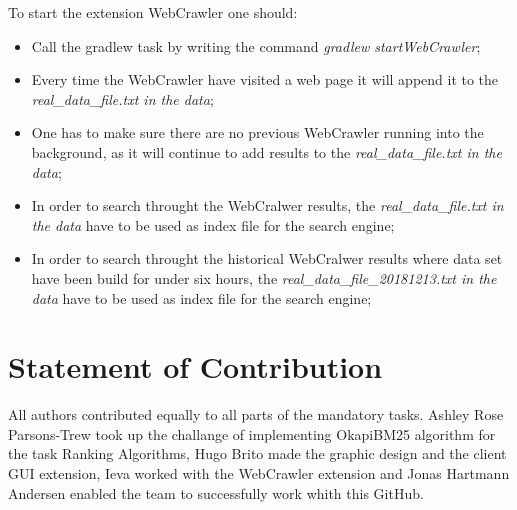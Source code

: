 To start the extension WebCrawler one should:
\begin{itemize}

\item Call the gradlew task by writing the command  \textit{gradlew startWebCrawler};
\item Every time the WebCrawler have visited a web page it will append it to the \textit{real\_data\_file.txt in the data};
\item One has to make sure there are no previous WebCrawler running into the background, as it will continue to add results to the \textit{real\_data\_file.txt in the data};
\item In order to search throught the WebCralwer results, the \textit{real\_data\_file.txt in the data} have to be used as index file for the search engine;
\item In order to search throught the historical WebCralwer results where data set have been build for under six hours, the \textit{real\_data\_file\_20181213.txt in the data} have to be used as index file for the search engine;

\end{itemize}

\section{Statement of Contribution}
\label{sec:Statement of Contribution}
All authors contributed equally to all parts of the mandatory tasks. Ashley Rose Parsons-Trew took up the challange of implementing OkapiBM25 algorithm for the task Ranking Algorithms, Hugo Brito made the graphic design and the client GUI extension, Ieva worked with the WebCrawler extension and Jonas Hartmann Andersen enabled the team to successfully work whith this GitHub.